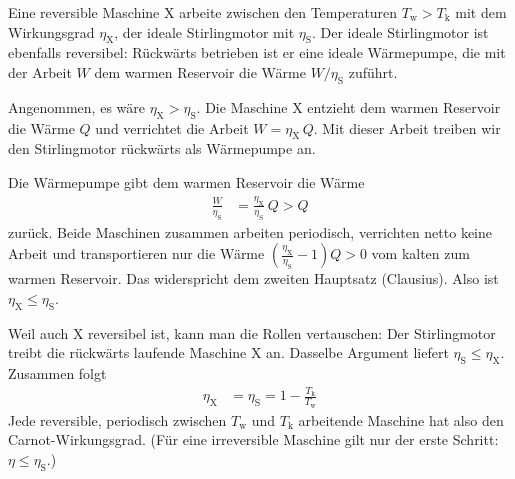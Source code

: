 Eine reversible Maschine X arbeite zwischen den Temperaturen $T_\text{w} > T_\text{k}$ mit dem Wirkungsgrad $\eta_\text{X}$, der ideale Stirlingmotor mit $\eta_\text{S}$. Der ideale Stirlingmotor ist ebenfalls reversibel: Rückwärts betrieben ist er eine ideale Wärmepumpe, die mit der Arbeit $W$ dem warmen Reservoir die Wärme $W/\eta_\text{S}$ zuführt.

Angenommen, es wäre $\eta_\text{X} > \eta_\text{S}$. Die Maschine X entzieht dem warmen Reservoir die Wärme $Q$ und verrichtet die Arbeit $W = \eta_\text{X}\,Q$. Mit dieser Arbeit treiben wir den Stirlingmotor rückwärts als Wärmepumpe an.
\begin{center}
\end{center}
Die Wärmepumpe gibt dem warmen Reservoir die Wärme
\begin{align}
 \frac{W}{\eta_\text{S}} &= \frac{\eta_\text{X}}{\eta_\text{S}}\,Q > Q
\end{align}
zurück. Beide Maschinen zusammen arbeiten periodisch, verrichten netto keine Arbeit und transportieren nur die Wärme $\left(\frac{\eta_\text{X}}{\eta_\text{S}}-1\right)Q > 0$ vom kalten zum warmen Reservoir. Das widerspricht dem zweiten Hauptsatz (Clausius). Also ist $\eta_\text{X} \leq \eta_\text{S}$.

Weil auch X reversibel ist, kann man die Rollen vertauschen: Der Stirlingmotor treibt die rückwärts laufende Maschine X an. Dasselbe Argument liefert $\eta_\text{S} \leq \eta_\text{X}$. Zusammen folgt
\begin{align}
 \eta_\text{X} &= \eta_\text{S} = 1-\frac{T_\text{k}}{T_\text{w}}
\end{align}
Jede reversible, periodisch zwischen $T_\text{w}$ und $T_\text{k}$ arbeitende Maschine hat also den Carnot-Wirkungsgrad. (Für eine irreversible Maschine gilt nur der erste Schritt: $\eta \leq \eta_\text{S}$.)
